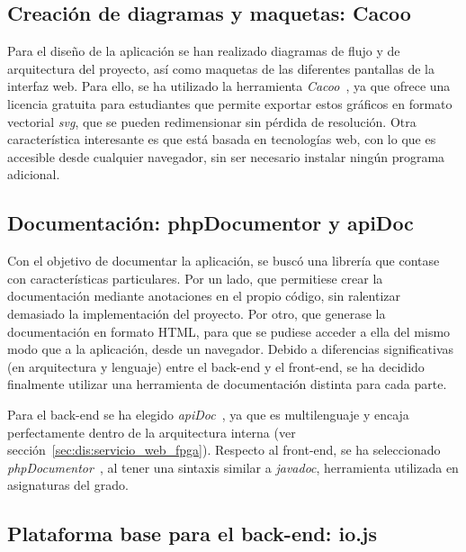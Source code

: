 \subsection*{Creación de diagramas y maquetas: Cacoo\label{ssec:dp:cacoo}}

Para el diseño de la aplicación se han realizado diagramas de flujo y de arquitectura del proyecto, así como maquetas de las diferentes pantallas de la interfaz web.
Para ello, se ha utilizado la herramienta \textit{Cacoo}~\cite{cacoo}, ya que ofrece una licencia gratuita para estudiantes que permite exportar estos gráficos en formato vectorial \textit{svg}, que se pueden redimensionar sin pérdida de resolución.
Otra característica interesante es que está basada en tecnologías web, con lo que es accesible desde cualquier navegador, sin ser necesario instalar ningún programa adicional.

\subsection*{Documentación: phpDocumentor y apiDoc\label{ssec:dp:docs}}

Con el objetivo de documentar la aplicación, se buscó una librería que contase con características particulares.
Por un lado, que permitiese crear la documentación mediante anotaciones en el propio código, sin ralentizar demasiado la implementación del proyecto.
Por otro, que generase la documentación en formato \gls{HTML}, para que se pudiese acceder a ella del mismo modo que a la aplicación, desde un navegador.
Debido a diferencias significativas (en arquitectura y lenguaje) entre el \gls{back-end} y el \gls{front-end}, se ha decidido finalmente utilizar una herramienta de documentación distinta para cada parte.

Para el \gls{back-end} se ha elegido \textit{apiDoc}~\cite{apidoc}, ya que es multilenguaje y encaja perfectamente dentro de la arquitectura interna (ver sección~\ref{sec:dis:servicio_web_fpga}).
Respecto al \gls{front-end}, se ha seleccionado \textit{phpDocumentor}~\cite{phpdocumentor}, al tener una sintaxis similar a \textit{javadoc}, herramienta utilizada en asignaturas del grado.

\subsection*{Plataforma base para el \gls{back-end}: io.js\label{ssec:dp:back-end}}

